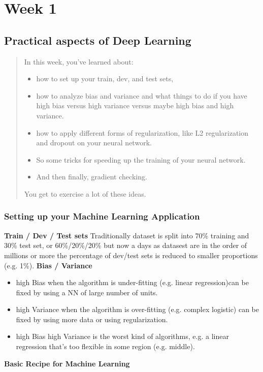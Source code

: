 \section*{Week 1}
\subsection*{Practical aspects of Deep Learning}
\begin{quote}
 In this week, you've learned about:
 \begin{itemize}
    \item how to set up your train, dev, and test sets,
    \item how to analyze bias and variance and what things to do if you have high bias versus high variance versus maybe high bias and high variance.
    \item how to apply different forms of regularization, like L2 regularization and dropout on your neural network.
    \item So some tricks for speeding up the training of your neural network.
    \item And then finally, gradient checking.
\end{itemize}
You get to exercise a lot of these ideas.
\end{quote}

\subsubsection*{Setting up your Machine Learning Application}
\textbf{Train / Dev / Test sets} Traditionally dataset is split into 70\% training and 30\% test set, or 60\%/20\%/20\% but now a days as datasest are in the order of millions or more the percentage of dev/test sets is reduced to smaller proportions (e.g. 1\%).
\newline
\textbf{Bias / Variance} 
\begin{itemize}
    \item high Bias when the algorithm is under-fitting (e.g. linear regression)can be fixed by using a NN of large number of units.
    \item high Variance when the algorithm is over-fitting (e.g. complex logistic) can be fixed by using more data or using regularization.
    \item high Bias high Variance is the worst kind of algorithms, e.g. a linear regression that's too flexible in some region (e.g. middle).
\end{itemize}
\textbf{Basic Recipe for Machine Learning}

